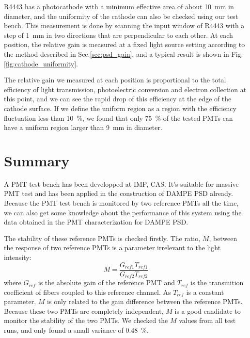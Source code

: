 \documentclass[review, times]{elsarticle}
\begin{document}
R4443 has a photocathode with a minimum effective area of about \SI{10}{\milli\meter} in diameter, and the uniformity of the cathode can also be checked using our test bench.
This measurement is done by scanning the input window of R4443 with a step of \SI{1}{\milli\meter} in two directions that are perpendicular to each other.
At each position, the relative gain is measured at a fixed light source setting according to the method described in Sec.\ref{sec:psd_gain}, and a typical result is shown in Fig.\ref{fig:cathode_uniformity}.

The relative gain we measured at each position is proportional to the total efficiency of light transmission, photoelectric conversion and electron collection at this point, and we can see the rapid drop of this efficiency at the edge of the cathode surface. 
If we define the uniform region as a region with the efficiency fluctuation less than \SI{10}{\percent}, we found that only \SI{75}{\percent} of the tested PMTs can have a uniform region larger than \SI{9}{\milli\meter} in diameter. 

\section{Summary}
\label{sec:summary}

A PMT test bench has been developped at IMP, CAS. 
It's suitable for massive PMT test and has been applied in the construction of DAMPE PSD already.
Because the PMT test bench is monitored by two reference PMTs all the time, we can also get some knowledge about the performance of this system using the data obtained in the PMT characterization for DAMPE PSD.

The stability of these reference PMTs is checked firstly.
The ratio, $M$, between the response of two reference PMTs is a parameter irrelevant to the light intensity: 
\begin{equation}
 M = \frac{G_{ref1} T_{ref1}}{G_{ref2} T_{ref2}}
 \label{equ:stability}
\end{equation}
where $G_{ref}$ is the absolute gain of the reference PMT and $T_{ref}$ is the transmition coefficient of fibers coupled to this reference channel.
As $T_{ref}$ is a constant parameter, $M$ is only related to the gain difference between the reference PMTs.
Because these two PMTs are completely independent, $M$ is a good candidate to monitor the stability of the two PMTs. 
We checked the $M$ values from all test runs, and only found a small variance of \SI{0.48}{\percent}. 
\end{document}
